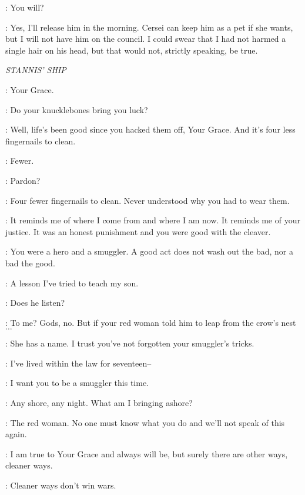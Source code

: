 \LANCEL: You will? 

\TYRION: Yes, I'll release him in the morning. Cersei can keep him as a pet if she wants, but I will not have him on the council. I could swear that I had not harmed a single hair on his head, but that would not, strictly speaking, be true. 



\scene

\textit{STANNIS' SHIP} 


\DAVOS: Your Grace. 

\STANNIS: Do your knucklebones bring you luck? 

\DAVOS: Well, life's been good since you hacked them off, Your Grace. And it's four less fingernails to clean. 

\STANNIS: Fewer. 

\DAVOS: Pardon? 

\STANNIS: Four fewer fingernails to clean. Never understood why you had to wear them. 

\DAVOS: It reminds me of where I come from and where I am now. It reminds me of your justice. It was an honest punishment and you were good with the cleaver. 

\STANNIS: You were a hero and a smuggler. A good act does not wash out the bad, nor a bad the good. 

\DAVOS: A lesson I've tried to teach my son. 

\STANNIS: Does he listen? 

\DAVOS: To me? Gods, no. But if your red woman told him to leap from the crow's nest $\ldots$  

\STANNIS: She has a name. I trust you've not forgotten your smuggler's tricks. 

\DAVOS: I've lived within the law for seventeen-- 

\STANNIS:   I want you to be a smuggler this time. 

\DAVOS: Any shore, any night. What am I bringing ashore? 

\STANNIS: The red woman. No one must know what you do and we'll not speak of this again. 

\DAVOS: I am true to Your Grace and always will be, but surely there are other ways, cleaner ways. 

\STANNIS: Cleaner ways don't win wars. 


